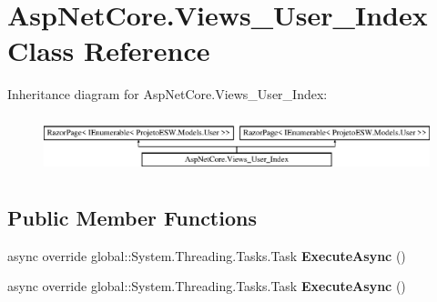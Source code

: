 \hypertarget{class_asp_net_core_1_1_views___user___index}{}\section{Asp\+Net\+Core.\+Views\+\_\+\+User\+\_\+\+Index Class Reference}
\label{class_asp_net_core_1_1_views___user___index}
Inheritance diagram for Asp\+Net\+Core.\+Views\+\_\+\+User\+\_\+\+Index\+:\begin{figure}[H]
\begin{center}
\leavevmode
\includegraphics[height=1.661721cm]{class_asp_net_core_1_1_views___user___index}
\end{center}
\end{figure}
\subsection*{Public Member Functions}
\begin{DoxyCompactItemize}
\item 
\mbox{\label{class_asp_net_core_1_1_views___user___index_a544cca833bd75d344d99a6a84dd9fab2}} 
async override global\+::\+System.\+Threading.\+Tasks.\+Task {\bfseries Execute\+Async} ()
\item 
\mbox{\label{class_asp_net_core_1_1_views___user___index_a544cca833bd75d344d99a6a84dd9fab2}} 
async override global\+::\+System.\+Threading.\+Tasks.\+Task {\bfseries Execute\+Async} ()
\end{DoxyCompactItemize}
